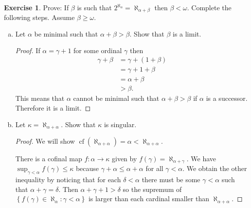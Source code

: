 \documentclass{article}
\theoremstyle{definition}
\newtheorem{question}{Exercise}
\newcommand{\set}[1]{\left\{#1\right\}}
\newcommand{\setwith}[2]{\set{#1\colon#2}}
\DeclareMathOperator{\cof}{cf}
\begin{document}
\begin{question}
    Prove: If \(\beta\) is such that
    \(2^{\aleph_{\alpha}}=\aleph_{\alpha+\beta}\) then \(\beta<\omega\).
    Complete the following steps. Assume \(\beta\geq\omega\).
    \begin{enumerate}[a.]
        \item Let \(\alpha\) be minimal such that \(\alpha+\beta>\beta\).
              Show that \(\beta\) is a limit.

              \begin{proof}
                  If \(\alpha=\gamma+1\) for some ordinal \(\gamma\) then
                  \begin{align*}
                      \gamma+\beta & =\gamma+(1+\beta) \\
                                   & =\gamma+1+\beta   \\
                                   & =\alpha+\beta     \\
                                   & >\beta.
                  \end{align*}
                  This means that \(\alpha\) cannot be minimal such that
                  \(\alpha+\beta>\beta\) if \(\alpha\) is a successor. Therefore
                  it is a limit.
              \end{proof}

        \item Let \(\kappa=\aleph_{\alpha+\alpha}\). Show that \(\kappa\) is
              singular.

              \begin{proof}
                  We will show
                  \(\cof(\aleph_{\alpha+\alpha})=\alpha<\aleph_{\alpha+\alpha}\).

                  There is a cofinal map \(f:\alpha\to\kappa\) given by
                  \(f(\gamma)=\aleph_{\alpha+\gamma}\). We have
                  \(\sup_{\gamma<\alpha}f(\gamma)\leq\kappa\) because
                  \(\gamma+\alpha\leq\alpha+\alpha\) for all \(\gamma<\alpha\).
                  We obtain the other inequality by noticing that for each
                  \(\delta<\alpha\) there must be some \(\gamma<\alpha\) such
                  that \(\alpha+\gamma=\delta\). Then \(\alpha+\gamma+1>\delta\)
                  so the supremum of
                  \(\setwith{f(\gamma)\in\aleph_{\alpha}}{\gamma<\alpha}\) is
                  larger than each cardinal smaller than
                  \(\aleph_{\alpha+\alpha}\).


\end{proof}
\end{enumerate}
\end{question}
\end{document}
